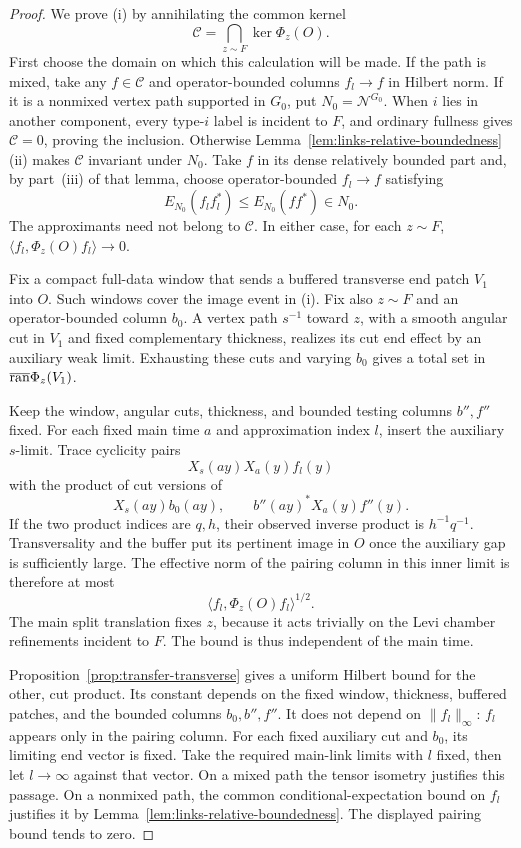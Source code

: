 \begin{proof}
We prove \textup{(i)} by annihilating the common kernel
\[
 \mathcal C=\bigcap_{z\sim F}\ker\Phi_z(O).
\]
First choose the domain on which this calculation will be made.  If the
path is mixed, take any $f\in\mathcal C$ and operator-bounded columns
$f_l\to f$ in Hilbert norm.  If it is a nonmixed vertex path supported
in $G_0$, put $N_0=\mathcal N^{G_0}$.  When $i$ lies in another
component, every type-$i$ label is incident to $F$, and ordinary
fullness gives $\mathcal C=0$, proving the inclusion.  Otherwise
Lemma~\ref{lem:links-relative-boundedness}\textup{(ii)} makes
$\mathcal C$ invariant under $N_0$.  Take $f$ in its dense relatively
bounded part and, by part~\textup{(iii)} of that lemma, choose
operator-bounded $f_l\to f$ satisfying
\[
 E_{N_0}(f_lf_l^*)\leq E_{N_0}(ff^*)\in N_0.
\]
The approximants need not belong to $\mathcal C$.  In either case,
for each $z\sim F$,
$\langle f_l,\Phi_z(O)f_l\rangle\to0$.

Fix a compact full-data window that sends a buffered transverse end
patch $V_1$ into $O$.  Such windows cover the image event in
\textup{(i)}.  Fix also $z\sim F$ and an operator-bounded column
$b_0$.  A vertex path $s^{-1}$ toward $z$, with a smooth angular cut
in $V_1$ and fixed complementary thickness, realizes its cut end
effect by an auxiliary weak limit.  Exhausting these cuts and
varying $b_0$ gives a total set in
$\overline{\operatorname{ran}}\Phi_z(V_1)$.

Keep the window, angular cuts, thickness, and bounded testing columns
$b'',f''$ fixed.  For each fixed main time $a$ and approximation
index $l$, insert the auxiliary $s$-limit.  Trace cyclicity pairs
\begin{equation}
 X_s(ay)X_a(y)f_l(y)
 \label{eq:transfer-incidence-pairing}
\end{equation}
with the product of cut versions of
\[
 X_s(ay)b_0(ay),\qquad
 b''(ay)^*X_a(y)f''(y).
\]
If the two product indices are $q,h$, their observed inverse product
is $h^{-1}q^{-1}$.  Transversality and the buffer put its pertinent
image in $O$ once the auxiliary gap is sufficiently large.
The effective norm of the pairing column in this inner limit is
therefore at most
\[
 \langle f_l,\Phi_z(O)f_l\rangle^{1/2}.
\]
The main split translation fixes $z$, because it acts trivially on
the Levi chamber refinements incident to $F$.  The bound is thus
independent of the main time.

Proposition~\ref{prop:transfer-transverse} gives a uniform Hilbert
bound for the other, cut product.  Its constant depends on the fixed
window, thickness, buffered patches, and the bounded columns
$b_0,b'',f''$.  It does not depend on $\|f_l\|_\infty$: $f_l$
appears only in the pairing column.  For each fixed auxiliary cut
and $b_0$, its limiting end vector is fixed.  Take the required
main-link limits with $l$ fixed, then let $l\to\infty$ against
that vector.  On a mixed path the tensor isometry justifies this
passage.  On a nonmixed path, the common conditional-expectation
bound on $f_l$ justifies it by
Lemma~\ref{lem:links-relative-boundedness}.  The displayed pairing
bound tends to zero.


\end{proof}
